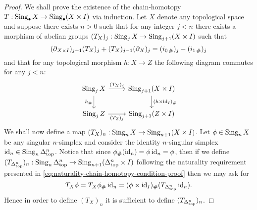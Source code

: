 \begin{proof}
We shall prove the existence of the chain-homotopy
\(T: \operatorname{Sing}_{\bullet} X \to \operatorname{Sing}_{\bullet}(X \times I)\) via induction. Let
\(X\) denote any topological space and suppose there exists \(n > 0\) such that
for any integer \(j < n\) there exists a morphism of abelian groups \((T_X)_j:
\operatorname{Sing}_j X \to \operatorname{Sing}_{j+1}(X \times I)\) such that
\begin{equation}\label{eq:chain-homotopy-condition-proof}
(\operatorname{\partial}_{X \times I})_{j+1} (T_X)_j + (T_X)_{j-1} (\operatorname{\partial}_X)_j
= (i_{0\, \#})_j - (i_{1\, \#})_j
\end{equation}
and that for any topological morphism \(h: X \to Z\) the following diagram
commutes for any \(j < n\):
\begin{equation}\label{eq:naturality-chain-homotopy-condition-proof}
\begin{tikzcd}
\Sing_j X \ar[r, "(T_X)_j"] \ar[d, "h_{\#}"']
&\Sing_{j+1}(X \times I) \ar[d, "(h \times \Id_I)_{\#}"] \\
\Sing_j Z \ar[r, "(T_Z)_j"']
&\Sing_{j+1}(Z \times I)
\end{tikzcd}
\end{equation}
We shall now define a map \((T_X)_n: \operatorname{Sing}_n X \to \operatorname{Sing}_{n+1}(X \times
I)\). Let \(\phi \in \operatorname{Sing}_n X\) be any singular \(n\)-simplex and consider the
identity \(n\)-singular simplex \(\operatorname{id}_n \in \operatorname{Sing}_n \Delta_{\text{top}}^n\). Notice that
since \(\phi_{\#}(\operatorname{id}_n) = \phi \operatorname{id}_n = \phi\), then if we define
\((T_{\Delta_{\text{top}}^n})_n: \operatorname{Sing}_n\Delta_{\text{top}}^n \to \operatorname{Sing}_{n+1}(\Delta_{\text{top}}^n \times I)\)
following the naturality requirement presented in
\cref{eq:naturality-chain-homotopy-condition-proof} then we may ask for
\begin{equation}\label{eq:T-X-n-phi-chain-homotopy}
T_X\phi = T_X \phi_{\#}\operatorname{id}_n
= (\phi \times \operatorname{id}_I)_{\#}(T_{\Delta_{\text{top}}^n} \operatorname{id}_n).
\end{equation}
Hence in order to define \((T_X)_n\) it is sufficient to define
\((T_{\Delta_{\text{top}}^n})_n\).


\end{proof}
